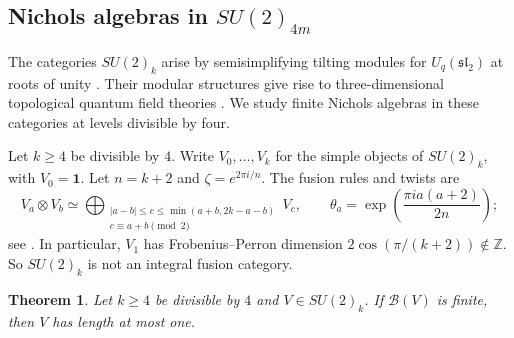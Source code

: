 \documentclass[11pt, a4paper]{article}
\numberwithin{equation}{section}
\newcommand{\B}{\mathcal B}
\newcommand{\one}{\mathbf 1}
\newtheorem{theorem}{Theorem}[section]
\begin{document}
\begingroup
\subsection{Nichols algebras in \texorpdfstring{$SU(2)_{4m}$}{SU(2)4m}}
The categories $SU(2)_k$ arise by semisimplifying tilting
modules for $U_q(\mathfrak{sl}_2)$ at roots of unity
\cite[Section~5.1]{GMR24}.
Their modular structures give rise to three-dimensional
topological quantum field theories
\cite[Section~1]{RSW09}.
We study finite Nichols algebras in these categories at
levels divisible by four.

Let $k\ge4$ be divisible by $4$. Write $V_0,\ldots,V_k$ for
the simple objects of $SU(2)_k$, with $V_0=\one$.  Let
$n=k+2$ and $\zeta=e^{2\pi i/n}$. The fusion rules and twists are
\begin{equation}\label{app:su2-data}
 V_a\otimes V_b\simeq
 \bigoplus_{\substack{|a-b|\le c\le\min(a+b,2k-a-b)\\
                      c\equiv a+b\pmod2}}V_c,
 \qquad
 \theta_a=\exp\!\left(\frac{\pi i a(a+2)}{2n}\right);
\end{equation}
see \cite[Example~5.1]{GMR24}.
In particular, $V_1$ has Frobenius--Perron dimension
$2\cos(\pi/(k+2))\notin\mathbb Z$. So $SU(2)_k$ is not an integral fusion category.

\begin{theorem}\label{app:su2}
Let $k\ge4$ be divisible by $4$ and $V\in SU(2)_k$.
If $\B(V)$ is finite, then $V$ has length at most one.
\end{theorem}
\end{document}

